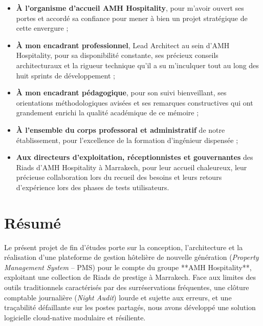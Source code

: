 \begin{itemize}[label=\textcolor{primaryBlue}{\small$\blacktriangleright$}]
    \item \textbf{À l'organisme d'accueil AMH Hospitality}, pour m'avoir ouvert ses portes et accordé sa confiance pour mener à bien un projet stratégique de cette envergure ;
    \item \textbf{À mon encadrant professionnel}, Lead Architect au sein d'AMH Hospitality, pour sa disponibilité constante, ses précieux conseils architecturaux et la rigueur technique qu'il a su m'inculquer tout au long des huit sprints de développement ;
    \item \textbf{À mon encadrant pédagogique}, pour son suivi bienveillant, ses orientations méthodologiques avisées et ses remarques constructives qui ont grandement enrichi la qualité académique de ce mémoire ;
    \item \textbf{À l'ensemble du corps professoral et administratif} de notre établissement, pour l'excellence de la formation d'ingénieur dispensée ;
    \item \textbf{Aux directeurs d'exploitation, réceptionnistes et gouvernantes} des Riads d'AMH Hospitality à Marrakech, pour leur accueil chaleureux, leur précieuse collaboration lors du recueil des besoins et leurs retours d'expérience lors des phases de tests utilisateurs.
\end{itemize}

\clearpage

\chapter*{Résumé}

Le présent projet de fin d'études porte sur la conception, l'architecture et la réalisation d'une plateforme de gestion hôtelière de nouvelle génération (\textit{Property Management System} -- PMS) pour le compte du groupe **AMH Hospitality**, exploitant une collection de Riads de prestige à Marrakech. Face aux limites des outils traditionnels caractérisés par des surréservations fréquentes, une clôture comptable journalière (\textit{Night Audit}) lourde et sujette aux erreurs, et une traçabilité défaillante sur les postes partagés, nous avons développé une solution logicielle cloud-native modulaire et résiliente.

